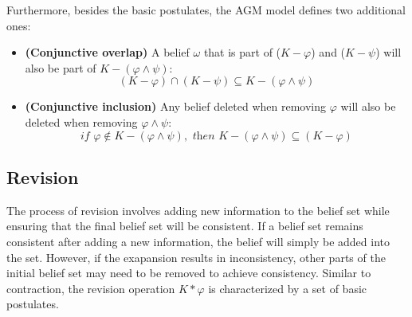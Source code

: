 Furthermore, besides the basic postulates, the AGM model defines two additional ones:

\begin{itemize}
    \item[] \textbf{(Conjunctive overlap)} A belief $\omega$ that is part of ($K - \varphi$) and ($K - \psi$) will also be part of $K - (\varphi \wedge \psi)$:
    $$(K - \varphi) \cap (K - \psi) \subseteq K-(\varphi \wedge \psi)$$

    \item[] \textbf{(Conjunctive inclusion)} Any belief deleted when removing $\varphi$ will also be deleted when removing $\varphi \wedge \psi$:
    $$\textit{if } \varphi \notin K - (\varphi \wedge \psi), \textit{ then } K - (\varphi \wedge \psi) \subseteq (K - \varphi)$$
\end{itemize}

\subsection{Revision}
\label{subsec:revision}

The process of revision involves adding new information to the belief set while ensuring that the final belief set will be consistent. If a belief set remains consistent after adding a new information, the belief will simply be added into the set. However, if the exapansion results in inconsistency, other parts of the initial belief set may need to be removed to achieve consistency. Similar to contraction, the revision operation $K * \varphi$ is characterized by a set of basic postulates.

